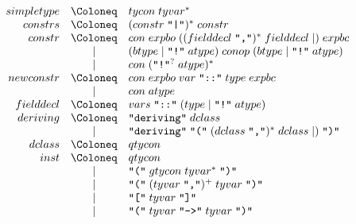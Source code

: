 \begin{align*}
  \begin{array}{rcl}
    {simpletype}
    & \Coloneq & {tycon}\; {tyvar}^* \\
    {constrs}
    & \Coloneq & ({constr}\; \text{\texttt{\textquotedbl|\textquotedbl}})^*\; {constr} \\
    {constr}
    & \Coloneq & {con}\; {expbo}\; (({fielddecl}\; \text{\texttt{\textquotedbl,\textquotedbl}})^*\; {fielddecl} \mid )\; {expbc} \\
    & \mid & ({btype} \mid \text{\texttt{\textquotedbl!\textquotedbl}}\; {atype})\; {conop}\; ({btype} \mid \text{\texttt{\textquotedbl!\textquotedbl}}\; {atype}) \\
    & \mid & {con}\; (\text{\texttt{\textquotedbl!\textquotedbl}}^?\; {atype})^* \\
    {newconstr}
    & \Coloneq & {con}\; {expbo}\; {var}\; \text{\texttt{\textquotedbl ::\textquotedbl}}\; {type}\; {expbc} \\
    & \mid & {con}\; {atype} \\
    {fielddecl}
    & \Coloneq & {vars}\; \text{\texttt{\textquotedbl ::\textquotedbl}}\; ({type} \mid \text{\texttt{\textquotedbl !\textquotedbl}}\; {atype}) \\
    {deriving}
    & \Coloneq & \text{\texttt{\textquotedbl deriving\textquotedbl}}\; {dclass} \\
    & \mid & \text{\texttt{\textquotedbl deriving\textquotedbl}}\; \text{\texttt{\textquotedbl(\textquotedbl}}\; ({dclass}\; \text{\texttt{\textquotedbl,\textquotedbl}})^*\; {dclass} \mid )\; \text{\texttt{\textquotedbl)\textquotedbl}} \\
    {dclass}
    & \Coloneq & {qtycon} \\
    {inst}
    & \Coloneq & {qtycon} \\
    & \mid & \text{\texttt{\textquotedbl(\textquotedbl}}\; {gtycon}\; {tyvar}^*\; \text{\texttt{\textquotedbl)\textquotedbl}} \\
    & \mid & \text{\texttt{\textquotedbl(\textquotedbl}}\; ({tyvar}\; \text{\texttt{\textquotedbl,\textquotedbl}})^+\; {tyvar}\; \text{\texttt{\textquotedbl)\textquotedbl}} \\
    & \mid & \text{\texttt{\textquotedbl[\textquotedbl}}\; {tyvar}\; \text{\texttt{\textquotedbl]\textquotedbl}} \\
    & \mid & \text{\texttt{\textquotedbl(\textquotedbl}}\; {tyvar}\; \text{\texttt{\textquotedbl ->\textquotedbl}}\; {tyvar}\; \text{\texttt{\textquotedbl)\textquotedbl}}
  \end{array}
\end{align*}

